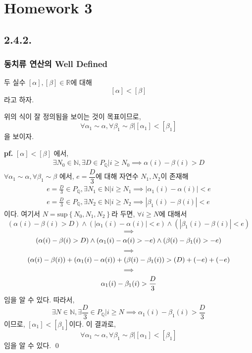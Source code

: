 \documentclass{article}
\begin{document}
\twocolumn

\chapter{Homework 3}

\section{2.4.2.}
\subsection{동치류 연산의 Well Defined}
두 실수 $[\alpha], [\beta] \in \mathbb{R}$에 대해
$$[\alpha] < [\beta]$$
라고 하자.

위의 식이 잘 정의됨을 보이는 것이 목표이므로,
$$\forall \alpha_1 \sim \alpha, \forall \beta_1 \sim \beta \bigg| [\alpha_1] < [\beta_1]$$
을 보이자.

\textbf{pf.} $[\alpha] < [\beta]$ 에서,
\begin{align*}
\exists N_0 \in \mathbb{N}, \exists D \in P_\mathbb{Q} \bigg| i \ge N_0 \implies \alpha(i) - \beta(i) > D \tag{1}
\end{align*}
$\forall \alpha_1 \sim \alpha, \forall \beta_1 \sim \beta$ 에서, $e = \dfrac{D}{3}$에 대해 자연수 $N_1, N_2$이 존재해
\begin{align*}
e = \frac{D}{3} \in P_\mathbb{Q}, \exists N_1 \in \mathbb{N} \bigg| i \ge N_1 \implies \left| \alpha_1 (i) - \alpha(i)  \right| < e \tag{2}\\
e = \frac{D}{3} \in P_\mathbb{Q}, \exists N_2 \in \mathbb{N} \bigg| i \ge N_2 \implies \left| \beta_1 (i) - \beta(i)  \right| < e \tag{3}
\end{align*}이다. 여기서 $N = \text{sup}\left\{N_0, N_1, N_2\right\}$라 두면, $\forall i \ge N$에 대해서
$$(\alpha(i) - \beta(i) > D )\wedge( \left| \alpha_1 (i) - \alpha(i)  \right| < e )\wedge( \left| \beta_1 (i) - \beta(i)  \right| < e) $$
$$\implies$$
$$(\alpha(i) - \beta(i) > D )\wedge( \alpha_1 (i) - \alpha(i) > -e )\wedge( \beta (i) - \beta_1(i)  > -e) \\$$
$$\implies$$
$$(\alpha(i) - \beta(i)) + (\alpha_1 (i) - \alpha(i)) + (\beta (i) - \beta_1(i))  > (D) + (-e) + (-e) \\$$
$$\implies$$
$$\alpha_1 (i) - \beta_1(i)  > \frac{D}{3} \\$$
임을 알 수 있다. 따라서,
$$\exists N \in \mathbb{N}, \exists \frac{D}{3} \in P_\mathbb{Q} \bigg| i \ge N \implies \alpha_1(i) - \beta_1(i) > \frac{D}{3}$$
이므로, $[\alpha_1] < [\beta_1]$이다. 이 결과로,
$$\forall \alpha_1 \sim \alpha, \forall \beta_1 \sim \beta \bigg| [\alpha_1] < [\beta_1]$$
임을 알 수 있다. \qed
\end{document}

